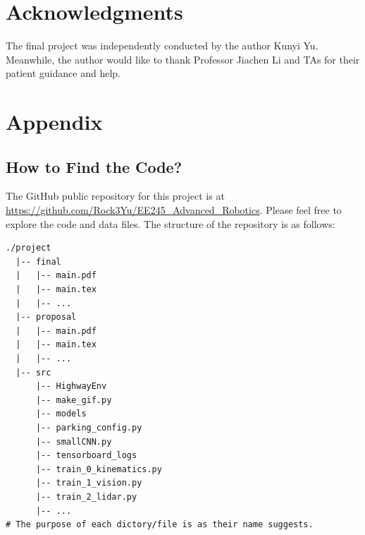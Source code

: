 \documentclass{article}
\begin{document}
\section*{Acknowledgments}
The final project was independently conducted by the author Kunyi Yu. Meanwhile, the author would like to thank Professor Jiachen Li and TAs for their patient guidance and help.




\appendix
\section*{Appendix}
\subsection*{How to Find the Code?}
The GitHub public repository for this project is at \url{https://github.com/Rock3Yu/EE245_Advanced_Robotics}. Please feel free to explore the code and data files. The structure of the repository is as follows:

\begin{verbatim}
./project
  |-- final
  |   |-- main.pdf
  |   |-- main.tex
  |   |-- ...
  |-- proposal
  |   |-- main.pdf
  |   |-- main.tex
  |   |-- ...
  |-- src
      |-- HighwayEnv
      |-- make_gif.py
      |-- models
      |-- parking_config.py
      |-- smallCNN.py
      |-- tensorboard_logs
      |-- train_0_kinematics.py
      |-- train_1_vision.py
      |-- train_2_lidar.py
      |-- ...
# The purpose of each dictory/file is as their name suggests.
\end{verbatim}
\end{document}
